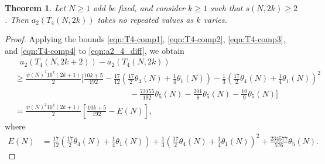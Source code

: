 \documentclass[11pt,letterpaper,reqno]{amsart}
\numberwithin{figure}{section}
\numberwithin{table}{section}
\theoremstyle{definition}
\theoremstyle{plain}
\newcommand{\lrp}[1]{\left(#1\right)}
\newcommand{\lrb}[1]{\left[#1\right]}
\newtheorem{theorem}{Theorem}[section]
\theoremstyle{definition}
\theoremstyle{definition}
\theoremstyle{remark}
\numberwithin{equation}{section}
\begin{document}
{
\renewcommand{\thetheorem}{\ref{theorem:main4}}
\begin{theorem}
    Let $N \ge 1$ odd be fixed, and consider $k \geq 1$ such that $s(N,2k) \ge 2$. Then 
    $a_2(T_4(N, 2k))$
    takes no repeated values as $k$ varies.
\end{theorem}
\addtocounter{theorem}{-1}
}


\begin{proof}
Applying the bounds \eqref{eqn:T4-comp1}, \eqref{eqn:T4-comp2}, \eqref{eqn:T4-comp3}, and \eqref{eqn:T4-comp4} to \eqref{eqn:a2_4_diff}, we obtain
\begin{align}
    &\ \ \ a_2(T_4(N, 2k + 2)) - a_2(T_4(N, 2k)) \\
    &\geq \frac{\psi(N)^2 16^k (2k+1)}{2} \Bigg[
        \frac{10k+5}{192} - \frac{17}{12} \lrp{\frac{17}{2} \theta_4(N) + \frac14 \theta_1(N)}  - \frac{1}{3} \lrp{\frac{17}{2} \theta_4(N) + \frac14 \theta_1(N)}^2 \\
        &\qquad\qquad\qquad\qquad\qquad\qquad\qquad
        - \frac{73155}{192} \theta_5(N) - \frac{201}{8} \theta_5(N) - \frac{10}{9} \theta_5(N)
        \Bigg] \\
    &=  \frac{\psi(N)^2 16^k (2k+1)}{2} \lrb{ \frac{10k+5}{192} - E(N) },  \label{eqn:temp-T4-a2-diff-EN}
\end{align}
where
\begin{align}
    E(N) &=  \frac{17}{12} \lrp{\frac{17}{2} \theta_4(N) + \frac14 \theta_1(N)}  + \frac{1}{3} \lrp{\frac{17}{2} \theta_4(N) + \frac14 \theta_1(N)}^2 + \frac{234577}{576} \theta_5(N).
\end{align}


\end{proof}
\end{document}
